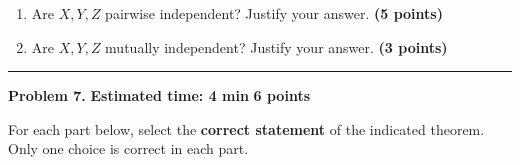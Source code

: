 \documentclass[11pt]{article}
\begin{document}
\begin{enumerate}[label=(\alph*),leftmargin=*,itemsep=0.8em]

    \item Are \(X,Y,Z\) pairwise independent? Justify your answer.
    \hfill \textbf{(5 points)}

    \item Are \(X,Y,Z\) mutually independent? Justify your answer.
    \hfill \textbf{(3 points)}

\end{enumerate}

\hrule



\newpage

\begin{problemheader}
\textbf{Problem 7.}
\hfill
\textbf{Estimated time: 4 min}
\qquad
\textbf{6 points}
\end{problemheader}

For each part below, select the \textbf{correct statement} of the indicated
theorem. Only one choice is correct in each part.
\end{document}
